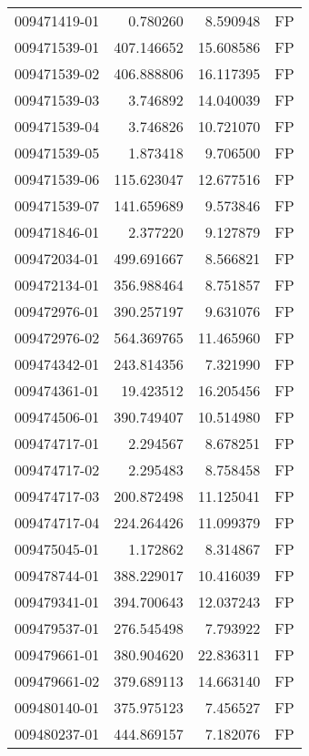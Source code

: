 \begin{tabular}{lrrl}
009471419-01 &    0.780260 &       8.590948 &   FP \\
009471539-01 &  407.146652 &      15.608586 &   FP \\
009471539-02 &  406.888806 &      16.117395 &   FP \\
009471539-03 &    3.746892 &      14.040039 &   FP \\
009471539-04 &    3.746826 &      10.721070 &   FP \\
009471539-05 &    1.873418 &       9.706500 &   FP \\
009471539-06 &  115.623047 &      12.677516 &   FP \\
009471539-07 &  141.659689 &       9.573846 &   FP \\
009471846-01 &    2.377220 &       9.127879 &   FP \\
009472034-01 &  499.691667 &       8.566821 &   FP \\
009472134-01 &  356.988464 &       8.751857 &   FP \\
009472976-01 &  390.257197 &       9.631076 &   FP \\
009472976-02 &  564.369765 &      11.465960 &   FP \\
009474342-01 &  243.814356 &       7.321990 &   FP \\
009474361-01 &   19.423512 &      16.205456 &   FP \\
009474506-01 &  390.749407 &      10.514980 &   FP \\
009474717-01 &    2.294567 &       8.678251 &   FP \\
009474717-02 &    2.295483 &       8.758458 &   FP \\
009474717-03 &  200.872498 &      11.125041 &   FP \\
009474717-04 &  224.264426 &      11.099379 &   FP \\
009475045-01 &    1.172862 &       8.314867 &   FP \\
009478744-01 &  388.229017 &      10.416039 &   FP \\
009479341-01 &  394.700643 &      12.037243 &   FP \\
009479537-01 &  276.545498 &       7.793922 &   FP \\
009479661-01 &  380.904620 &      22.836311 &   FP \\
009479661-02 &  379.689113 &      14.663140 &   FP \\
009480140-01 &  375.975123 &       7.456527 &   FP \\
009480237-01 &  444.869157 &       7.182076 &   FP \\

\end{tabular}
